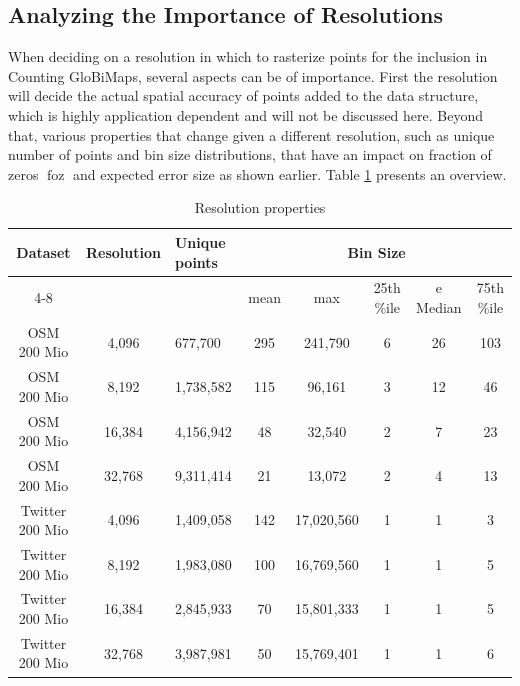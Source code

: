 \documentclass[sigconf]{acmart}
\DeclareMathOperator{\foz}{foz}
\begin{document}
\subsection{Analyzing the Importance of Resolutions}
When deciding on a resolution in which to rasterize points for the inclusion in Counting GloBiMaps, several aspects can be of importance. First the resolution will decide the actual spatial accuracy of points added to the data structure, which is highly application dependent and will not be discussed here. Beyond that, various properties that change given a different resolution, such as unique number of points and bin size distributions, that have an impact on fraction of zeros $\foz$ and expected error size as shown earlier. Table \ref{table:Resolutions} presents an overview.

\begin{table}[b!]
  \centering
  \begin{tabular}{|c|c|l|c|c|c|c|c|}
    \hline
    \multirow{2}{*}{\bfseries Dataset}       &
    \multirow{2}{*}{\bfseries Resolution}    &
    \multirow{2}{*}{\bfseries Unique points} &
    \multicolumn{5}{|c|}{\bfseries Bin Size}                                                                               \\
    \cline{4-8}                              &        &           & mean & max        & 25th \%ile & e Median & 75th \%ile \\
    \hline
    OSM 200 Mio                              & 4,096  & 677,700   & 295  & 241,790    & 6          & 26       & 103        \\
    \hline
    OSM 200 Mio                              & 8,192  & 1,738,582 & 115  & 96,161     & 3          & 12       & 46         \\
    \hline
    OSM 200 Mio                              & 16,384 & 4,156,942 & 48   & 32,540     & 2          & 7        & 23         \\
    \hline
    OSM 200 Mio                              & 32,768 & 9,311,414 & 21   & 13,072     & 2          & 4        & 13         \\
    \hline
    Twitter 200 Mio                          & 4,096  & 1,409,058 & 142  & 17,020,560 & 1          & 1        & 3          \\
    \hline
    Twitter 200 Mio                          & 8,192  & 1,983,080 & 100  & 16,769,560 & 1          & 1        & 5          \\
    \hline
    Twitter 200 Mio                          & 16,384 & 2,845,933 & 70   & 15,801,333 & 1          & 1        & 5          \\
    \hline
    Twitter 200 Mio                          & 32,768 & 3,987,981 & 50   & 15,769,401 & 1          & 1        & 6          \\
    \hline
  \end{tabular}
  \caption{Resolution properties}
  \label{table:Resolutions}
\end{table}
\end{document}
